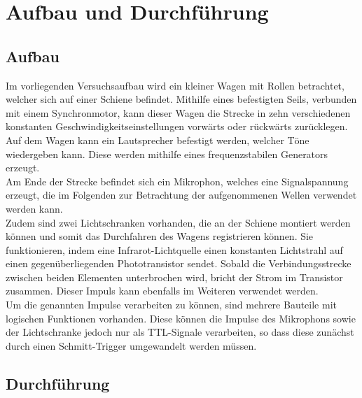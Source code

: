 \section{Aufbau und Durchführung}
\subsection{Aufbau}
\label{sec:Aufbau}
Im vorliegenden Versuchsaufbau wird ein kleiner Wagen mit Rollen betrachtet, welcher sich auf einer Schiene befindet.
Mithilfe eines befestigten Seils, verbunden mit einem Synchronmotor, kann dieser Wagen die Strecke in zehn verschiedenen konstanten Geschwindigkeitseinstellungen vorwärts oder rückwärts zurücklegen.
Auf dem Wagen kann ein Lautsprecher befestigt werden, welcher Töne wiedergeben kann.
Diese werden mithilfe eines frequenzstabilen Generators erzeugt.\\
Am Ende der Strecke befindet sich ein Mikrophon, welches eine Signalspannung erzeugt, die im Folgenden zur Betrachtung der aufgenommenen Wellen verwendet werden kann.\\
Zudem sind zwei Lichtschranken vorhanden, die an der Schiene montiert werden können und somit das Durchfahren des Wagens registrieren können.
Sie funktionieren, indem eine Infrarot-Lichtquelle einen konstanten Lichtstrahl auf einen gegenüberliegenden Phototransistor sendet.
Sobald die Verbindungsstrecke zwischen beiden Elementen unterbrochen wird, bricht der Strom im Transistor zusammen.
Dieser Impuls kann ebenfalls im Weiteren verwendet werden.\\
Um die genannten Impulse verarbeiten zu können, sind mehrere Bauteile mit logischen Funktionen vorhanden.
Diese können die Impulse des Mikrophons sowie der Lichtschranke jedoch nur als TTL-Signale verarbeiten, so dass diese zunächst durch einen Schmitt-Trigger umgewandelt werden müssen.

\subsection{Durchführung}
